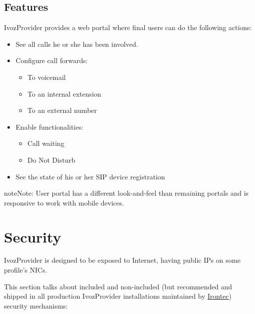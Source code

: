 \documentclass[letterpaper,10pt,english]{sphinxmanual}
\begin{document}
\section{Features}
\label{user_portal/features::doc}\label{user_portal/features:features}
IvozProvider provides a web portal where final users can do the following
actions:
\begin{itemize}
\item {} 
See all calls he or she has been involved.

\item {} 
Configure call forwards:
\begin{itemize}
\item {} 
To voicemail

\item {} 
To an internal extension

\item {} 
To an external number

\end{itemize}

\item {} 
Enable functionalities:
\begin{itemize}
\item {} 
Call waiting

\item {} 
Do Not Disturb

\end{itemize}

\item {} 
See the state of his or her SIP device registration

\end{itemize}

\begin{notice}{note}{Note:}
User portal has a different look-and-feel than remaining portals and is responsive to work with mobile devices.
\end{notice}


\chapter{Security}
\label{security_and_maintenance/security/index:security}\label{security_and_maintenance/security/index::doc}
IvozProvider is designed to be exposed to Internet, having public IPs on some profile's NICs.

This section talks about included and non-included (but recommended and shipped in all production IvozProvider
installations maintained by \href{https://www.irontec.com}{Irontec}) security mechanisms:
\end{document}
